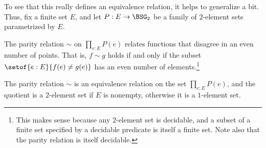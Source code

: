 To see that this really defines an equivalence relation, it helps to generalize a bit.
Thus, fix a finite set $E$, and let $P : E \to \BSG_2$ be a family of $2$-element sets parametrized by $E$.
\begin{definition}
  The parity relation $\sim$ on $\prod_{e:E}P(e)$ relates functions that disagree in an even number of points. That is, $f\sim g$ holds if and only if the
  subset $\setof{e:E}{f(e) \ne g(e)}$ has an even number of elements.\footnote{%
    This makes sense because any $2$-element set is decidable,
    and a subset of a finite set specified by a decidable predicate
    is itself a finite set.
    Note also that the parity relation is itself decidable.}
\end{definition}
\begin{lemma}
  The parity relation $\sim$ is an equivalence relation on the set $\prod_{e:E}P(e)$,
  and the quotient is a $2$-element set if $E$ is nonempty, otherwise it is
  a $1$-element set.
\end{lemma}
